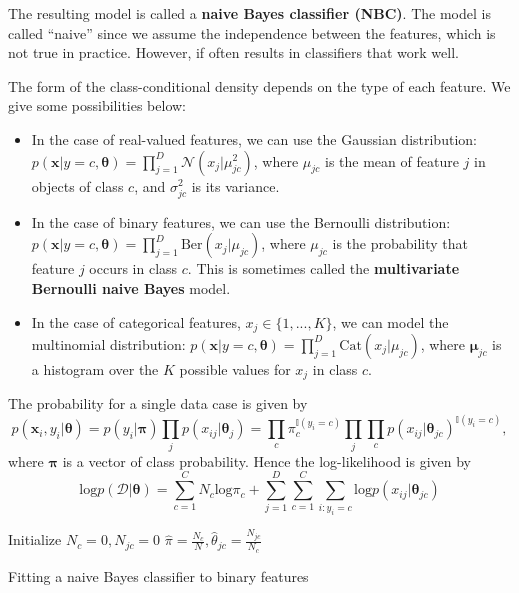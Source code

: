   The resulting model is called a \textbf{naive Bayes classifier (NBC)}. The model is called ``naive'' since we assume the independence between the features, which is not true in practice. However, if often results in classifiers that work well.

  The form of the class-conditional density depends on the type of each feature. We give some possibilities below:
  \begin{itemize}
    \item In the case of real-valued features, we can use the Gaussian distribution: $p(\mathbf{x}|y=c, \boldsymbol{\theta}) = \prod_{j=1}^{D}\mathcal{N}(x_j|\mu_{jc}^2)$, where $\mu_{jc}$ is the mean of feature $j$ in objects of class $c$, and $\sigma_{jc}^2$ is its variance.
    \item In the case of binary features, we can use the Bernoulli distribution: $p(\mathbf{x}|y=c, \boldsymbol{\theta}) = \prod_{j=1}^{D}\textrm{Ber}(x_j|\mu_{jc})$, where $\mu_{jc}$ is the probability that feature $j$ occurs in class $c$. This is sometimes called the \textbf{multivariate Bernoulli naive Bayes} model.
    \item In the case of categorical features, $x_j\in \{1,...,K\}$, we can model the multinomial distribution: $p(\mathbf{x}|y=c, \boldsymbol{\theta}) = \prod_{j=1}^{D}\textrm{Cat}(x_j|\mu_{jc})$, where $\boldsymbol{\mu}_{jc}$ is a histogram over the $K$ possible values for $x_j$ in class $c$.
  \end{itemize}

The probability for a single data case is given by
$$p(\mathbf{x}_i,y_i|\boldsymbol{\theta}) = p(y_i|\boldsymbol{\pi})\prod_{j}p(x_{ij}|\boldsymbol{\theta}_j)=\prod_{c}\pi_{c}^{\mathds{I}(y_i=c)}\prod_{j}\prod_{c}p(x_{ij}|\boldsymbol{\theta}_{jc})^{\mathds{I}(y_i=c)},$$
where $\boldsymbol{\pi}$ is a vector of class probability. Hence the log-likelihood is given by
	$$\textrm{log}p(\mathcal{D}|\boldsymbol{\theta}) = \sum_{c=1}^{C}N_c\textrm{log}\pi_c+\sum_{j=1}^{D}\sum_{c=1}^{C}\sum_{i:y_i=c}\textrm{log}p(x_{ij}|\boldsymbol{\theta}_{jc})$$

	\begin{algorithm}[H]
		\SetAlgoLined
		Initialize $N_c=0,N_{jc}=0$ \;
  $\hat{\pi}=\frac{N_c}{N},\hat{\theta}_{jc}=\frac{N_{jc}}{N_c}$
	\caption{Fitting a naive Bayes classifier to binary features}
\end{algorithm}
